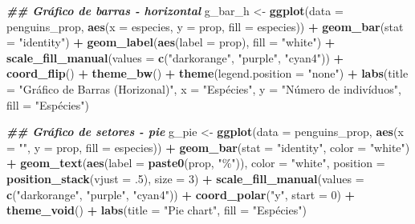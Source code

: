 \documentclass[
]{article}
\newenvironment{Shaded}{\begin{snugshade}}{\end{snugshade}}
\newcommand{\AttributeTok}[1]{\textcolor[rgb]{0.13,0.29,0.53}{#1}}
\newcommand{\DecValTok}[1]{\textcolor[rgb]{0.00,0.00,0.81}{#1}}
\newcommand{\DocumentationTok}[1]{\textcolor[rgb]{0.56,0.35,0.01}{\textbf{\textit{#1}}}}
\newcommand{\FunctionTok}[1]{\textcolor[rgb]{0.13,0.29,0.53}{\textbf{#1}}}
\newcommand{\NormalTok}[1]{#1}
\newcommand{\OtherTok}[1]{\textcolor[rgb]{0.56,0.35,0.01}{#1}}
\newcommand{\SpecialCharTok}[1]{\textcolor[rgb]{0.81,0.36,0.00}{\textbf{#1}}}
\newcommand{\StringTok}[1]{\textcolor[rgb]{0.31,0.60,0.02}{#1}}
\begin{document}
\begin{Shaded}
\begin{Highlighting}[]
\DocumentationTok{\#\# Gráfico de barras {-} horizontal  }
\NormalTok{g\_bar\_h }\OtherTok{\textless{}{-}} \FunctionTok{ggplot}\NormalTok{(}\AttributeTok{data =}\NormalTok{ penguins\_prop, }\FunctionTok{aes}\NormalTok{(}\AttributeTok{x =}\NormalTok{ especies, }\AttributeTok{y =}\NormalTok{ prop, }\AttributeTok{fill =}\NormalTok{ especies)) }\SpecialCharTok{+}
    \FunctionTok{geom\_bar}\NormalTok{(}\AttributeTok{stat =} \StringTok{"identity"}\NormalTok{) }\SpecialCharTok{+}
    \FunctionTok{geom\_label}\NormalTok{(}\FunctionTok{aes}\NormalTok{(}\AttributeTok{label =}\NormalTok{ prop), }\AttributeTok{fill =} \StringTok{"white"}\NormalTok{) }\SpecialCharTok{+}
    \FunctionTok{scale\_fill\_manual}\NormalTok{(}\AttributeTok{values =} \FunctionTok{c}\NormalTok{(}\StringTok{"darkorange"}\NormalTok{, }\StringTok{"purple"}\NormalTok{, }\StringTok{"cyan4"}\NormalTok{)) }\SpecialCharTok{+}
    \FunctionTok{coord\_flip}\NormalTok{() }\SpecialCharTok{+}
    \FunctionTok{theme\_bw}\NormalTok{() }\SpecialCharTok{+}
    \FunctionTok{theme}\NormalTok{(}\AttributeTok{legend.position =} \StringTok{"none"}\NormalTok{) }\SpecialCharTok{+}
    \FunctionTok{labs}\NormalTok{(}\AttributeTok{title =} \StringTok{"Gráfico de Barras (Horizonal)"}\NormalTok{, }\AttributeTok{x =} \StringTok{"Espécies"}\NormalTok{, }
         \AttributeTok{y =} \StringTok{"Número de indivíduos"}\NormalTok{, }\AttributeTok{fill =} \StringTok{"Espécies"}\NormalTok{)}

\DocumentationTok{\#\# Gráfico de setores {-} pie}
\NormalTok{g\_pie }\OtherTok{\textless{}{-}} \FunctionTok{ggplot}\NormalTok{(}\AttributeTok{data =}\NormalTok{ penguins\_prop, }\FunctionTok{aes}\NormalTok{(}\AttributeTok{x =} \StringTok{""}\NormalTok{, }\AttributeTok{y =}\NormalTok{ prop, }\AttributeTok{fill =}\NormalTok{ especies)) }\SpecialCharTok{+} 
    \FunctionTok{geom\_bar}\NormalTok{(}\AttributeTok{stat =} \StringTok{"identity"}\NormalTok{, }\AttributeTok{color =} \StringTok{"white"}\NormalTok{) }\SpecialCharTok{+}
    \FunctionTok{geom\_text}\NormalTok{(}\FunctionTok{aes}\NormalTok{(}\AttributeTok{label =} \FunctionTok{paste0}\NormalTok{(prop, }\StringTok{"\%"}\NormalTok{)), }\AttributeTok{color =} \StringTok{"white"}\NormalTok{, }
              \AttributeTok{position =} \FunctionTok{position\_stack}\NormalTok{(}\AttributeTok{vjust =}\NormalTok{ .}\DecValTok{5}\NormalTok{), }\AttributeTok{size =} \DecValTok{3}\NormalTok{) }\SpecialCharTok{+}
    \FunctionTok{scale\_fill\_manual}\NormalTok{(}\AttributeTok{values =} \FunctionTok{c}\NormalTok{(}\StringTok{"darkorange"}\NormalTok{, }\StringTok{"purple"}\NormalTok{, }\StringTok{"cyan4"}\NormalTok{)) }\SpecialCharTok{+}
    \FunctionTok{coord\_polar}\NormalTok{(}\StringTok{"y"}\NormalTok{, }\AttributeTok{start =} \DecValTok{0}\NormalTok{) }\SpecialCharTok{+}
    \FunctionTok{theme\_void}\NormalTok{() }\SpecialCharTok{+}
    \FunctionTok{labs}\NormalTok{(}\AttributeTok{title =} \StringTok{"Pie chart"}\NormalTok{, }\AttributeTok{fill =} \StringTok{"Espécies"}\NormalTok{)}


\end{Highlighting}
\end{Shaded}
\end{document}
